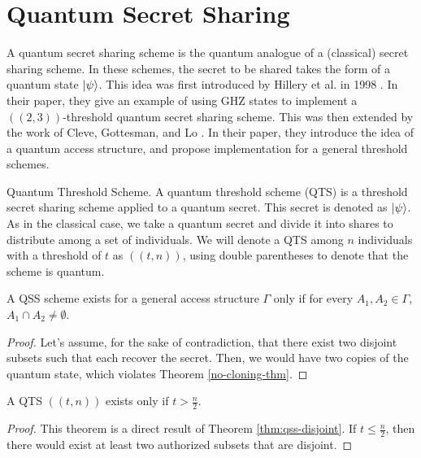\section{Quantum Secret Sharing}

A quantum secret sharing scheme is the quantum analogue of a (classical) secret sharing scheme. In these schemes, the secret to be shared takes the form of a quantum state $\ket{\psi}$. This idea was first introduced by Hillery et al. in 1998 \cite{Hillery_1999}. In their paper, they give an example of using GHZ states to implement a $((2,3))$-threshold quantum secret sharing scheme. This was then extended by the work of Cleve, Gottesman, and Lo \cite{Cleve_1999}. In their paper, they introduce the idea of a quantum access structure, and propose implementation for a general threshold schemes.

\begin{definition}{Quantum Threshold Scheme.}
    \label{defn:qts}
    A quantum threshold scheme (QTS) is a threshold secret sharing scheme applied to a quantum secret. This secret is denoted as $\ket{\psi}$. As in the classical case, we take a quantum secret and divide it into shares to distribute among a set of individuals. We will denote a QTS among $n$ individuals with a threshold of $t$ as $((t,n))$, using double parentheses to denote that the scheme is quantum.
\end{definition}

\begin{theorem}
    \label{thm:qss-disjoint}
    A QSS scheme exists for a general access structure $\Gamma$ only if for every $A_1, A_2 \in \Gamma$, $A_1 \cap A_2 \neq \emptyset$.
\end{theorem}

\begin{proof}
    Let's assume, for the sake of contradiction, that there exist two disjoint subsets such that each recover the secret. Then, we would have two copies of the quantum state, which violates Theorem \ref{no-cloning-thm}. 
\end{proof}

\begin{theorem}
    \label{qts}
    A QTS $((t,n))$ exists only if $t > \frac{n}{2}$.
\end{theorem}

\begin{proof}
    This theorem is a direct result of Theorem \ref{thm:qss-disjoint}. If $t \leq \frac{n}{2}$, then there would exist at least two authorized subsets that are disjoint. 
\end{proof}

